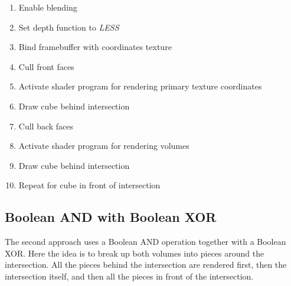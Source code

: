 \documentclass{article}
\begin{document}
\begin{enumerate}
  \item Enable blending
  \item Set depth function to \emph{LESS}
  \item Bind framebuffer with coordinates texture
  \item Cull front faces
  \item Activate shader program for rendering primary texture coordinates
  \item Draw cube behind intersection
  \item Cull back faces
  \item Activate shader program for rendering volumes
  \item Draw cube behind intersection
  \item Repeat for cube in front of intersection
\end{enumerate}

\subsection{Boolean AND with Boolean XOR}

The second approach uses a Boolean AND operation together with a Boolean XOR.
Here the idea is to break up both volumes into pieces around the intersection.
All the pieces behind the intersection are rendered first, then the intersection
itself, and then all the pieces in front of the intersection.
\end{document}
